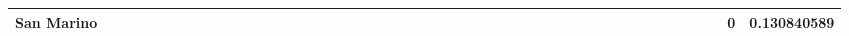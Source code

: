 \documentclass[a4paper,11pt]{report}
\begin{document}
\begin{appendices}
\begin{landscape}
\begin{longtable}{r|r|r|r|r|r|r|r|r|r|r|r|r|r|r|r|r|r|r|r|r|r|r|r|r|r|r|r|r|r|r|r|r|r|r|r|r|r|r|r|r|r|r|r|r|r|r|}
\multicolumn{1}{|r|}{\textbf{San Marino}}            &                                       &                                       &                                          &                                       &                                       &                                                     &                                        &                                       &                                      &                                       &                                       &                                                &                                       &                                      &                                       &                                       &                                      &                                       &                                       &                                       &                                      &                                     &                                      &                                         &                                     &                                       &                                          &                                      &                                        &                                       &                                      &                                          &                                      &                                        &                                        &                                     &                                      &                                           &                                               &                                      &                                       &                                              &                                      &                                     & 0                                             & 0.130840589                             \\ \hline

\end{longtable}
\end{landscape}
\end{appendices}
\end{document}
